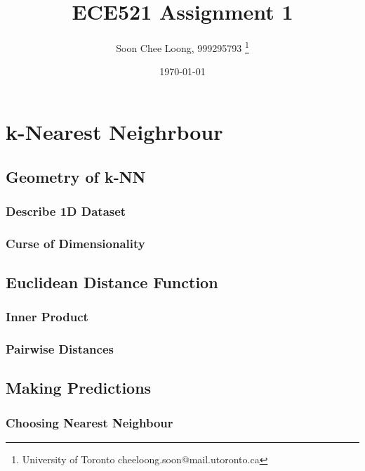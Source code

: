 \documentclass[a4paper,12pt]{article}
\begin{document}
\title{ECE521 Assignment 1}
\author{Soon Chee Loong, 999295793 \thanks{University of Toronto cheeloong.soon@mail.utoronto.ca}}
 
\date {\today}

\maketitle 
\tableofcontents

\section{k-Nearest Neighrbour}



\subsection{Geometry of k-NN}

\subsubsection{Describe 1D Dataset}

\subsubsection{Curse of Dimensionality}

\subsection{Euclidean Distance Function}

\subsubsection{Inner Product}

\subsubsection{Pairwise Distances}

\subsection{Making Predictions}

\subsubsection{Choosing Nearest Neighbour}
\end{document}
